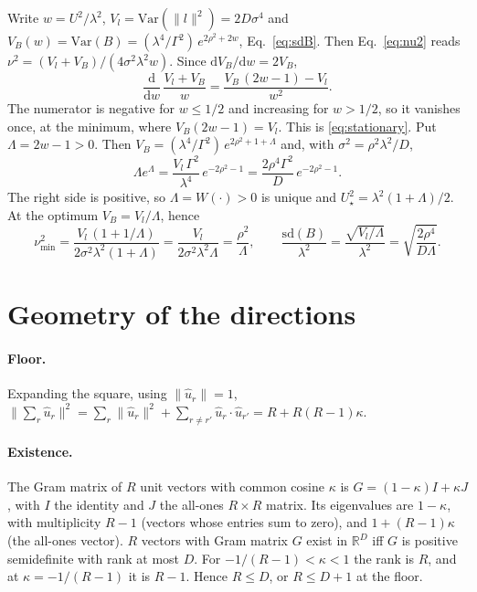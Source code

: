 \documentclass[11pt,a4paper]{article}
\newcommand{\RR}{\mathbb{R}}
\newcommand{\Var}{\mathrm{Var}}
\newcommand{\sd}{\mathrm{sd}}
\newcommand{\uhat}{\hat{u}}
\begin{document}
Write $w=U^2/\lambda^2$, $V_l=\Var(\|l\|^2)=2D\sigma^4$ and
$V_B(w)=\Var(B)=(\lambda^4/\Gamma^2)\,e^{2\rho^2+2w}$, Eq.~\eqref{eq:sdB}. Then
Eq.~\eqref{eq:nu2} reads $\nu^2=(V_l+V_B)/(4\sigma^2\lambda^2w)$. Since
$\mathrm dV_B/\mathrm dw=2V_B$,
\begin{equation*}
  \frac{\mathrm d}{\mathrm dw}\,\frac{V_l+V_B}{w}=\frac{V_B\,(2w-1)-V_l}{w^2}.
\end{equation*}
The numerator is negative for $w\le1/2$ and increasing for $w>1/2$, so it vanishes once, at
the minimum, where $V_B(2w-1)=V_l$. This is \eqref{eq:stationary}. Put $\Lambda=2w-1>0$.
Then $V_B=(\lambda^4/\Gamma^2)\,e^{2\rho^2+1+\Lambda}$ and, with $\sigma^2=\rho^2\lambda^2/D$,
\begin{equation*}
  \Lambda e^{\Lambda}=\frac{V_l\,\Gamma^2}{\lambda^4}\,e^{-2\rho^2-1}
  =\frac{2\rho^4\Gamma^2}{D}\,e^{-2\rho^2-1}.
\end{equation*}
The right side is positive, so $\Lambda=W(\cdot)>0$ is unique and
$U_\star^2=\lambda^2(1+\Lambda)/2$. At the optimum $V_B=V_l/\Lambda$, hence
\begin{equation*}
  \nu_{\min}^2=\frac{V_l\,(1+1/\Lambda)}{2\sigma^2\lambda^2(1+\Lambda)}
  =\frac{V_l}{2\sigma^2\lambda^2\Lambda}=\frac{\rho^2}{\Lambda},
  \qquad
  \frac{\sd(B)}{\lambda^2}=\frac{\sqrt{V_l/\Lambda}}{\lambda^2}=\sqrt{\frac{2\rho^4}{D\Lambda}}.
\end{equation*}

\section{Geometry of the directions}
\label{app:geom}

\paragraph{Floor.} Expanding the square, using $\|\uhat_r\|=1$,
$\|\sum_r\uhat_r\|^2=\sum_r\|\uhat_r\|^2+\sum_{r\neq r'}\uhat_r\cdot\uhat_{r'}=R+R(R-1)\kappa$.

\paragraph{Existence.} The Gram matrix of $R$ unit vectors with common cosine $\kappa$ is
$G=(1-\kappa)I+\kappa J$, with $I$ the identity and $J$ the all-ones $R\times R$ matrix. Its
eigenvalues are $1-\kappa$, with multiplicity $R-1$ (vectors whose entries sum to zero), and
$1+(R-1)\kappa$ (the all-ones vector). $R$ vectors with Gram matrix $G$ exist in $\RR^D$ iff
$G$ is positive semidefinite with rank at most $D$. For $-1/(R-1)<\kappa<1$ the rank is $R$,
and at $\kappa=-1/(R-1)$ it is $R-1$. Hence $R\le D$, or $R\le D+1$ at the floor.
\end{document}
